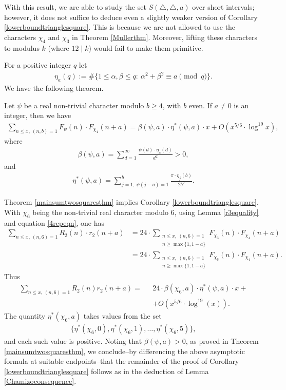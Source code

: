 \documentclass[12pt]{amsart}
\newcommand{\1}{\mathmybb{1}}
\begin{document}
With this result, we are able to study the set $S(\triangle, \triangle, a)$ over short intervals; however, it does not suffice to deduce even a slightly weaker version of Corollary \ref{lowerboundtrianglesquare}. This is because we are not allowed to use the characters $\chi_{4}$ and $\chi_{3}$ in Theorem \ref{Mullerthm}. Moreover, lifting these characters to modulus $k$ (where $12 \mid k$) would fail to make them primitive.

For a positive integer $q$ let
\begin{align*}
\eta_{a}(q):= \#\{1\leq \alpha,\beta\leq q: \ \alpha^2 + \beta^2 \equiv a \pmod q\}.
\end{align*}
We have the following theorem.
\begin{thm}
\label{mainsumtwosquaresthm}
Let $\psi$ be a real non-trivial character modulo $b \geq 4$, with $b$ even. If $a \neq 0$ is an integer, then we have
\begin{align}
\label{Theasymptoticformula}
\sum_{n \leq x, \ (n,b) = 1}F_{\psi}(n)\cdot F_{\chi_{4}}(n+a)= \beta(\psi,a)\cdot \eta^{*}(\psi,a)\cdot x+O(x^{5/6}\cdot\log^{19}x),
\end{align}
where 
\begin{align*}
\beta(\psi,a) = \sum_{d= 1}^{\infty}\frac{\psi(d)\cdot\eta_{a}(d)}{d^2} > 0,
\end{align*}
and
\begin{align*}
\eta^{*}(\psi,a) = \sum_{j=1, \ \psi(j-a) = 1}^{b}\frac{\pi \cdot \eta_{j}(b)}{2b^2}.
\end{align*}
\end{thm}
Theorem \ref{mainsumtwosquaresthm} implies Corollary \ref{lowerboundtrianglesquare}. With $\chi_{6}$ being the non-trivial real character modulo $6$, using Lemma \ref{r3equality} and equation \eqref{4repeqn}, one has 
\begin{align*}
\sum_{n\leq x, \ (n,6) = 1}R_{2}(n)\cdot r_{2}(n+a) &= 24\cdot\sum_{\substack{n\leq x, \ (n,6)=1\\ n \geq \max\{1,1-a\}}}F_{\chi_{3}}(n)\cdot F_{\chi_{4}}(n+a)\\
&=24\cdot\sum_{\substack{n\leq x, \ (n,6)=1\\ n \geq \max\{1,1-a\}}}F_{\chi_{6}}(n)\cdot F_{\chi_{4}}(n+a).
\end{align*}
Thus
\begin{align*}
\sum_{n\leq x, \ (n,6) = 1}R_{2}(n)r_{2}(n+a) = \text{ }&24\cdot\beta(\chi_{6},a)\cdot \eta^{*}(\psi,a)\cdot x+\\
&+O(x^{5/6}\cdot \log^{19}(x)).
\end{align*}
The quantity $\eta^{*}(\chi_{6},a)$ takes values from the set
\begin{align*}
\{\eta^{*}(\chi_{6},0),\eta^{*}(\chi_{6},1),\ldots,\eta^{*}(\chi_{6},5)\},
\end{align*}
and each such value is positive. Noting that $\beta(\psi,a)>0$, as proved in Theorem \ref{mainsumtwosquaresthm}, we conclude--by differencing the above asymptotic formula at suitable endpoints--that the remainder of the proof of Corollary \ref{lowerboundtrianglesquare} follows as in the deduction of Lemma \ref{Chamizoconsequence}.
\end{document}
